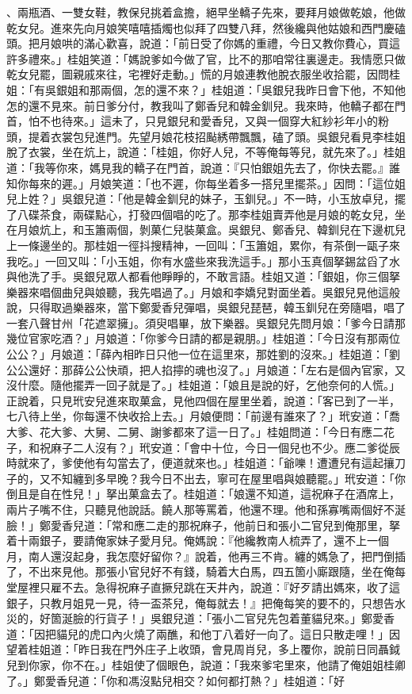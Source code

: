\begin{showcontents}{}
、兩瓶酒、一雙女鞋，教保兒挑着盒擔，絕早坐轎子先來，要拜月娘做乾娘，他做乾女兒。進來先向月娘笑嘻嘻插燭也似拜了四雙八拜，然後纔與他姑娘和西門慶磕頭。把月娘哄的滿心歡喜，說道：「前日受了你媽的重禮，今日又教你費心，買這許多禮來。」桂姐笑道：「媽說爹如今做了官，比不的那咱常往裏邊走。我情愿只做乾女兒罷，圖親戚來往，宅裡好走動。」慌的月娘連教他脫衣服坐收拾罷，因問桂姐：「有吳銀姐和那兩個，怎的還不來？」桂姐道：「吳銀兒我昨日會下他，不知他怎的還不見來。前日爹分付，教我叫了鄭香兒和韓金釧兒。我來時，他轎子都在門首，怕不也待來。」這未了，只見銀兒和愛香兒，又與一個穿大紅紗衫年小的粉頭，提着衣裳包兒進門。先望月娘花枝招颭綉帶飄飄，磕了頭。吳銀兒看見李桂姐脫了衣裳，坐在炕上，說道：「桂姐，你好人兒，不等俺每等兒，就先來了。」桂姐道：「我等你來，媽見我的轎子在門首，說道：『只怕銀姐先去了，你快去罷。』誰知你每來的遲。」月娘笑道：「也不遲，你每坐着多一搭兒里擺茶。」因問：「這位姐兒上姓？」吳銀兒道：「他是韓金釧兒的妹子，玉釧兒。」不一時，小玉放卓兒，擺了八碟茶食，兩碟點心，打發四個唱的吃了。那李桂姐賣弄他是月娘的乾女兒，坐在月娘炕上，和玉簫兩個，剝菓仁兒裝菓盒。吳銀兒、鄭香兒、韓釧兒在下邊杌兒上一條邊坐的。那桂姐一徑抖搜精神，一回叫：「玉簫姐，累你，有茶倒一甌子來我吃。」一回又叫：「小玉姐，你有水盛些來我洗這手。」那小玉真個拏錫盆舀了水與他洗了手。吳銀兒眾人都看他睜睜的，不敢言語。桂姐又道：「銀姐，你三個拏樂器來唱個曲兒與娘聽，我先唱過了。」月娘和李嬌兒對面坐着。吳銀兒見他這般說，只得取過樂器來，當下鄭愛香兒彈唱，吳銀兒琵琶，韓玉釧兒在旁隨唱，唱了一套八聲甘州「花遮翠擁」。須臾唱畢，放下樂器。吳銀兒先問月娘：「爹今日請那幾位官家吃酒？」月娘道：「你爹今日請的都是親朋。」桂姐道：「今日沒有那兩位公公？」月娘道：「薛內相昨日只他一位在這里來，那姓劉的沒來。」桂姐道：「劉公公還好：那薛公公快頑，把人掐擰的魂也沒了。」月娘道：「左右是個內官家，又沒什麼。隨他擺弄一回子就是了。」桂姐道：「娘且是說的好，乞他奈何的人慌。」正說着，只見玳安兒進來取菓盒，見他四個在屋里坐着，說道：「客已到了一半，七八待上坐，你每還不快收拾上去。」月娘便問：「前邊有誰來了？」玳安道：「喬大爹、花大爹、大舅、二舅、謝爹都來了這一日了。」桂姐問道：「今日有應二花子，和祝麻子二人沒有？」玳安道：「會中十位，今日一個兒也不少。應二爹從辰時就來了，爹使他有勾當去了，便道就來也。」桂姐道：「爺嚛！遭遭兒有這起攘刀子的，又不知纏到多早晚？我今日不出去，寧可在屋里唱與娘聽罷。」玳安道：「你倒且是自在性兒！」拏出菓盒去了。桂姐道：「娘還不知道，這祝麻子在酒席上，兩片子嘴不住，只聽見他說話。饒人那等罵着，他還不理。他和孫寡嘴兩個好不涎臉！」鄭愛香兒道：「常和應二走的那祝麻子，他前日和張小二官兒到俺那里，拏着十兩銀子，要請俺家妹子愛月兒。俺媽說：『他纔教南人梳弄了，還不上一個月，南人還沒起身，我怎麼好留你？』說着，他再三不肯。纏的媽急了，把門倒插了，不出來見他。那張小官兒好不有錢，騎着大白馬，四五箇小廝跟隨，坐在俺每堂屋裡只雇不去。急得祝麻子直撅兒跳在天井內，說道：『好歹請出媽來，收了這銀子，只教月姐見一見，待一盃茶兒，俺每就去！』把俺每笑的要不的，只想告水災的，好箇涎臉的行貨子！」吳銀兒道：「張小二官兒先包着董貓兒來。」鄭愛香道：「因把貓兒的虎口內火燒了兩醮，和他丁八着好一向了。這日只散走哩！」因望着桂姐道：「昨日我在門外庄子上收頭，會見周肖兒，多上覆你，說前日同聶鉞兒到你家，你不在。」桂姐使了個眼色，說道：「我來爹宅里來，他請了俺姐姐桂卿了。」鄭愛香兒道：「你和馮沒點兒相交？如何都打熱？」桂姐道：「好
\end{showcontents}
